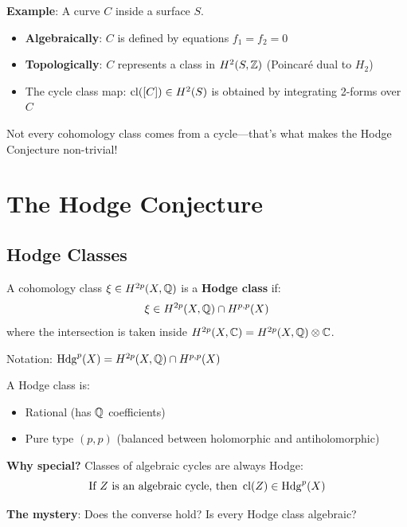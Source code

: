 \begin{intuitive}
\textbf{Example}: A curve $C$ inside a surface $S$.

\begin{itemize}
\item \textbf{Algebraically}: $C$ is defined by equations $f_1 = f_2 = 0$
\item \textbf{Topologically}: $C$ represents a class in $H^2(S, \mathbb{Z})$ (Poincaré dual to $H_2$)
\item The cycle class map: $\operatorname{cl}([C]) \in H^2(S)$ is obtained by integrating 2-forms over $C$
\end{itemize}

Not every cohomology class comes from a cycle—that's what makes the Hodge Conjecture non-trivial!
\end{intuitive}

\section{The Hodge Conjecture}

\subsection{Hodge Classes}

\begin{defn}\label{def:hodge-class}
A cohomology class $\xi \in H^{2p}(X, \mathbb{Q})$ is a \textbf{Hodge class} if:
\begin{equation}
\xi \in H^{2p}(X, \mathbb{Q}) \cap H^{p,p}(X)
\end{equation}
where the intersection is taken inside $H^{2p}(X, \mathbb{C}) = H^{2p}(X, \mathbb{Q}) \otimes \mathbb{C}$.

Notation: $\operatorname{Hdg}^p(X) = H^{2p}(X, \mathbb{Q}) \cap H^{p,p}(X)$
\end{defn}

\begin{keyidea}
A Hodge class is:
\begin{itemize}
\item Rational (has $\mathbb{Q}$ coefficients)
\item Pure type $(p,p)$ (balanced between holomorphic and antiholomorphic)
\end{itemize}

\textbf{Why special?} Classes of algebraic cycles are always Hodge:
\begin{equation}
\text{If } Z \text{ is an algebraic cycle, then } \operatorname{cl}(Z) \in \operatorname{Hdg}^p(X)
\end{equation}

\textbf{The mystery}: Does the converse hold? Is every Hodge class algebraic?
\end{keyidea}

